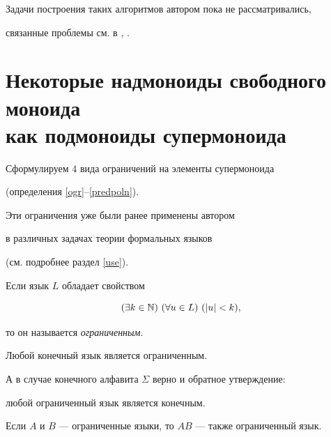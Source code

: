  Задачи построения таких алгоритмов автором пока не рассматривались,


 связанные проблемы см. в \cite{io7}, \cite{io9}.











 \section{Некоторые надмоноиды свободного моноида\protect\\


 как подмоноиды супермоноида}


 \label{subglo}





 Сформулируем $4$ вида ограничений на элементы супермоноида


 (определения \ref{ogr}--\ref{predpoln}).


 Эти ограничения уже были ранее применены автором


 в различных задачах теории формальных языков


 (см. подробнее раздел \ref{use}).





 \begin{defns} \label{ogr}


 Если язык $L$ обладает свойством


 $$


 (\exists k\in\BN)\ 


 (\forall u\in L)\ 


 (|u|<k),


 $$


 то он называется {\it ограниченным}.


 \end{defns}





 Любой конечный язык является ограниченным.


 А в случае конечного алфавита $\Sigma$ верно и обратное утверждение:


 любой ограниченный язык является конечным.





 \begin{props} \label{uo}


 Если $A$ и $B$ --- ограниченные языки, то $AB$ --- также ограниченный язык.


 \end{props}





